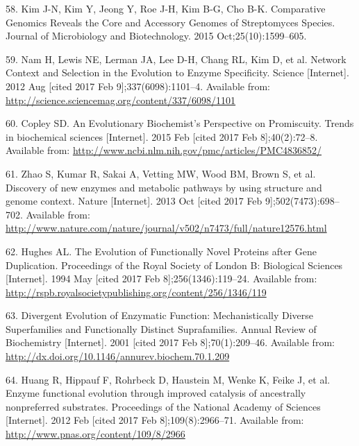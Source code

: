 \documentclass[12pt,twoside]{reedthesis}
\begin{document}
  \hypertarget{ref-kim_comparative_2015}{}
  58. Kim J-N, Kim Y, Jeong Y, Roe J-H, Kim B-G, Cho B-K. Comparative
  Genomics Reveals the Core and Accessory Genomes of Streptomyces Species.
  Journal of Microbiology and Biotechnology. 2015 Oct;25(10):1599--605.
  
  \hypertarget{ref-nam_network_2012}{}
  59. Nam H, Lewis NE, Lerman JA, Lee D-H, Chang RL, Kim D, et al. Network
  Context and Selection in the Evolution to Enzyme Specificity. Science
  {[}Internet{]}. 2012 Aug {[}cited 2017 Feb 9{]};337(6098):1101--4.
  Available from:
  \url{http://science.sciencemag.org/content/337/6098/1101}
  
  \hypertarget{ref-copley_evolutionary_2015}{}
  60. Copley SD. An Evolutionary Biochemist's Perspective on Promiscuity.
  Trends in biochemical sciences {[}Internet{]}. 2015 Feb {[}cited 2017
  Feb 8{]};40(2):72--8. Available from:
  \url{http://www.ncbi.nlm.nih.gov/pmc/articles/PMC4836852/}
  
  \hypertarget{ref-zhao_discovery_2013}{}
  61. Zhao S, Kumar R, Sakai A, Vetting MW, Wood BM, Brown S, et al.
  Discovery of new enzymes and metabolic pathways by using structure and
  genome context. Nature {[}Internet{]}. 2013 Oct {[}cited 2017 Feb
  9{]};502(7473):698--702. Available from:
  \url{http://www.nature.com/nature/journal/v502/n7473/full/nature12576.html}
  
  \hypertarget{ref-hughes_evolution_1994}{}
  62. Hughes AL. The Evolution of Functionally Novel Proteins after Gene
  Duplication. Proceedings of the Royal Society of London B: Biological
  Sciences {[}Internet{]}. 1994 May {[}cited 2017 Feb
  8{]};256(1346):119--24. Available from:
  \url{http://rspb.royalsocietypublishing.org/content/256/1346/119}
  
  \hypertarget{ref-gerlt_divergent_2001}{}
  63. Divergent Evolution of Enzymatic Function: Mechanistically Diverse
  Superfamilies and Functionally Distinct Suprafamilies. Annual Review of
  Biochemistry {[}Internet{]}. 2001 {[}cited 2017 Feb 8{]};70(1):209--46.
  Available from: \url{http://dx.doi.org/10.1146/annurev.biochem.70.1.209}
  
  \hypertarget{ref-huang_enzyme_2012}{}
  64. Huang R, Hippauf F, Rohrbeck D, Haustein M, Wenke K, Feike J, et al.
  Enzyme functional evolution through improved catalysis of ancestrally
  nonpreferred substrates. Proceedings of the National Academy of Sciences
  {[}Internet{]}. 2012 Feb {[}cited 2017 Feb 8{]};109(8):2966--71.
  Available from: \url{http://www.pnas.org/content/109/8/2966}
  
\end{document}
